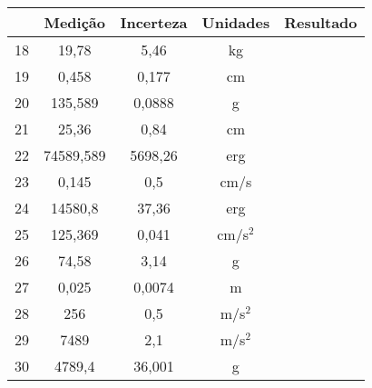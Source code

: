 \begin{center}
  \begin{tabular}{|c | c | c | c |>{ \centering\arraybackslash}m{8cm} |}  \hline
    & Medição	& Incerteza	& Unidades	& Resultado \\ \hline	 

18 & 19,78 & 5,46 & kg & \\ \hline
19 & 0,458 & 0,177 & cm & \\ \hline
20 & 135,589 & 0,0888 & g & \\ \hline
21 & 25,36 & 0,84 & cm & \\ \hline
22 & 74589,589 & 5698,26 & erg & \\ \hline
23 & 0,145 & 0,5 & cm/s & \\ \hline
24 & 14580,8 & 37,36 & erg & \\ \hline
25 & 125,369 & 0,041 & cm/s$^2$ & \\ \hline
26 & 74,58 & 3,14 & g & \\ \hline
27 & 0,025 & 0,0074 & m & \\ \hline
28 & 256 & 0,5 & m/s$^2$ & \\ \hline
29 & 7489 & 2,1 & m/s$^2$ & \\ \hline
30 & 4789,4 & 36,001 & g & \\ \hline
  \end{tabular}
\end{center}

